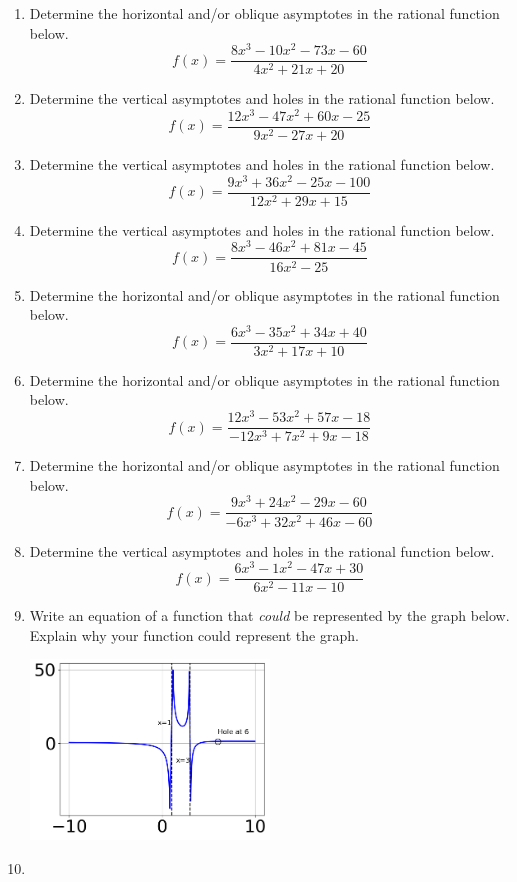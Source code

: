 \documentclass[14pt]{extbook}
\begin{document}
\begin{enumerate}
{\begin{center}
\end{center}
} \newpage
\item{
Determine the horizontal and/or oblique asymptotes in the rational function below.\[ f(x) = \frac{8x^{3} -10 x^{2} -73 x -60}{4x^{2} +21 x + 20} \]} \newpage
\item{
Determine the vertical asymptotes and holes in the rational function below.\[ f(x) = \frac{12x^{3} -47 x^{2} +60 x -25}{9x^{2} -27 x + 20} \]} \newpage
\item{
Determine the vertical asymptotes and holes in the rational function below.\[ f(x) = \frac{9x^{3} +36 x^{2} -25 x -100}{12x^{2} +29 x + 15} \]} \newpage
\item{
Determine the vertical asymptotes and holes in the rational function below.\[ f(x) = \frac{8x^{3} -46 x^{2} +81 x -45}{16x^{2} -25} \]} \newpage
\item{
Determine the horizontal and/or oblique asymptotes in the rational function below.\[ f(x) = \frac{6x^{3} -35 x^{2} +34 x + 40}{3x^{2} +17 x + 10} \]} \newpage
\item{
Determine the horizontal and/or oblique asymptotes in the rational function below.\[ f(x) = \frac{12x^{3} -53 x^{2} +57 x -18}{-12x^{3} +7 x^{2} +9 x -18} \]} \newpage
\item{
Determine the horizontal and/or oblique asymptotes in the rational function below.\[ f(x) = \frac{9x^{3} +24 x^{2} -29 x -60}{-6x^{3} +32 x^{2} +46 x -60} \]} \newpage
\item{
Determine the vertical asymptotes and holes in the rational function below.\[ f(x) = \frac{6x^{3} -1 x^{2} -47 x + 30}{6x^{2} -11 x -10} \]} \newpage
\item{
Write an equation of a function that \textit{could} be represented by the graph below. Explain why your function could represent the graph.
\begin{center}
    \includegraphics[width=0.5\textwidth]{../Figures/identifyGraphOfRationalFunctionC.png}
\end{center}
} \newpage
\item{
}
\end{enumerate}
\end{document}
